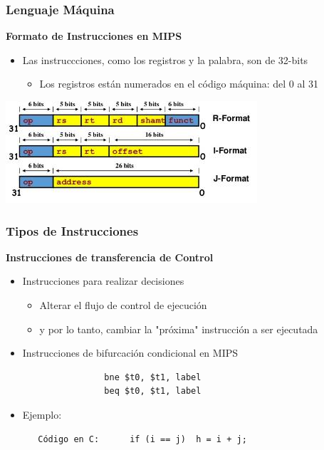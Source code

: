 \documentclass[aspectratio=169,compress]{beamer}
\begin{document}
\begin{footnotesize}
\begin{frame}[fragile]
\frametitle{Lenguaje Máquina}
\begin{center}\textbf{Formato de Instrucciones en MIPS}\end{center}
\begin{itemize}
\item Las instruccciones, como los registros y la palabra, son de 32-bits
\begin{itemize}
\item Los registros están numerados en el código máquina: del 0 al 31
\end{itemize}
\end{itemize}
	\begin{center}
\includegraphics[scale=0.7]{images/formato.jpg} 
	\end{center}
\end{frame}



\begin{frame}[fragile]
\frametitle{Tipos de Instrucciones}
\begin{center}\textbf{Instrucciones de transferencia de Control}\end{center}

\begin{itemize}
\item Instrucciones para realizar decisiones
\begin{itemize}
\item Alterar el flujo de control de ejecución
\item y por lo tanto, cambiar la "próxima" instrucción a ser ejecutada
\end{itemize}
\item Instrucciones de bifurcación condicional en MIPS
\begin{verbatim}
                bne $t0, $t1, label
                beq $t0, $t1, label
\end{verbatim}
\item Ejemplo:
\begin{verbatim}
   Código en C:      if (i == j)  h = i + j;


\end{verbatim}
\end{itemize}
\end{frame}
\end{footnotesize}
\end{document}
